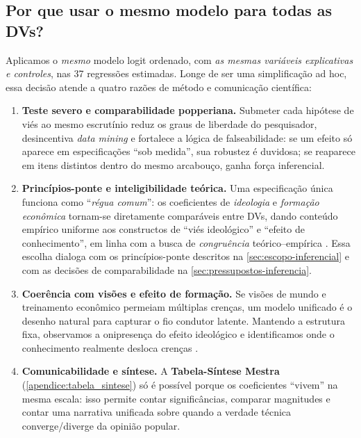 \subsection{Por que usar o mesmo modelo para todas as DVs?}\label{sec:modelo-unico}
Aplicamos o \emph{mesmo} modelo logit ordenado, com \emph{as mesmas variáveis explicativas e controles}, nas 37 regressões estimadas. Longe de ser uma simplificação ad hoc, essa decisão atende a quatro razões de método e comunicação científica:

\begin{enumerate}[label=\roman*)]
\item \textbf{Teste severo e comparabilidade popperiana.} Submeter cada hipótese de viés ao mesmo escrutínio reduz os graus de liberdade do pesquisador, desincentiva \emph{data mining} e fortalece a lógica de falseabilidade: se um efeito só aparece em especificações “sob medida”, sua robustez é duvidosa; se reaparece em itens distintos dentro do mesmo arcabouço, ganha força inferencial.

\item \textbf{Princípios-ponte e inteligibilidade teórica.} Uma especificação única funciona como “\emph{régua comum}”: os coeficientes de \emph{ideologia} e \emph{formação econômica} tornam-se diretamente comparáveis entre DVs, dando conteúdo empírico uniforme aos constructos de “viés ideológico” e “efeito de conhecimento”, em linha com a busca de \emph{congruência} teórico–empírica \cite{stigum2003}. Essa escolha dialoga com os princípios-ponte descritos na \autoref{sec:escopo-inferencial} e com as decisões de comparabilidade na \autoref{sec:pressupostos-inferencia}.

\item \textbf{Coerência com visões e efeito de formação.} Se visões de mundo e treinamento econômico permeiam múltiplas crenças, um modelo unificado é o desenho natural para capturar o fio condutor latente. Mantendo a estrutura fixa, observamos a onipresença do efeito ideológico e identificamos onde o conhecimento realmente desloca crenças \cite{sowell2007conflict,newman2020ideia}. 

\item \textbf{Comunicabilidade e síntese.} A \textbf{Tabela-Síntese Mestra} (\autoref{apendice:tabela_sintese}) só é possível porque os coeficientes “vivem” na mesma escala: isso permite contar significâncias, comparar magnitudes e contar uma narrativa unificada sobre quando a verdade técnica converge/diverge da opinião popular.
\end{enumerate}

